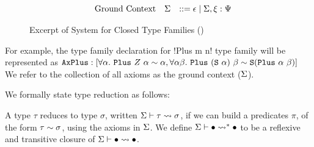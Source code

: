 \documentclass[format=acmsmall,manuscript,screen,nonacm,margin=1in,11pt]{acmart}
\begin{document}
\begin{figure}[ht]
\[\begin{array}{l l l l l}
      \\
      &\text{Ground Context} &\Sigma   &\mathrel{{:}{:}{=}} \epsilon \mathrel{\mid} \Sigma,\xi:\Psi
    \end{array}
  \]
  \caption[Excerpt \CLTF{}]{Excerpt of System for Closed Type Families (\CLTF)}
  \label{fig:syntax-tf-closed}
\end{figure}
For example, the type family declaration for !Plus m n! type family will be represented as
$\texttt{AxPlus}: [\forall\alpha.~{\texttt{Plus}~Z~\alpha} \mathrel{\sim} \alpha
, \forall\alpha\beta.~{\texttt{Plus}~(\texttt{S}~\alpha)~\beta} \mathrel{\sim} \texttt{S}(\texttt{Plus}~\alpha~\beta)]$
We refer to the collection of all axioms as the ground context ($\Sigma$).

We formally state type reduction as follows:
\begin{defn}
  \label{def:type-reduction}
  A type $\tau$ reduces to type $\sigma$, written $\Sigma \vdash \tau \rightsquigarrow \sigma$,
  if we can build a predicates $\pi$, of the form $\tau\mathrel{\sim}\sigma$, using the axioms in $\Sigma$.
  We define $\Sigma \vdash \bullet \rightsquigarrow^* \bullet$ to be a reflexive and transitive
  closure of $\Sigma \vdash \bullet \rightsquigarrow \bullet$.
\end{defn}
\end{document}

